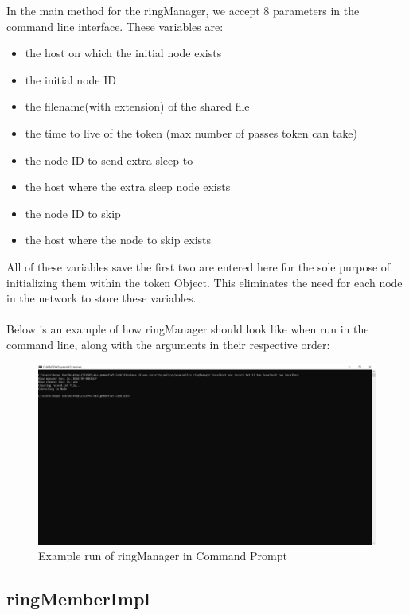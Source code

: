 \documentclass[11pt, a4paper]{article}
\begin{document}
In the main method for the ringManager, we accept 8 parameters in the command line interface. These variables are:
\begin{itemize}
\item the host on which the initial node exists
\item the initial node ID
\item the filename(with extension) of the shared file
\item the time to live of the token (max number of passes token can take)
\item the node ID to send extra sleep to
\item the host where the extra sleep node exists
\item the node ID to skip
\item the host where the node to skip exists
\end{itemize} 
All of these variables save the first two are entered here for the sole purpose of initializing them within the token Object. This eliminates the need for each node in the network to store these variables.\\\\
Below is an example of how ringManager should look like when run in the command line, along with the arguments in their respective order:
\begin{figure}[!h]
\centering
\includegraphics[scale=0.35]{ring_manager}
\caption{Example run of ringManager in Command Prompt}
\end{figure}

\subsection{ringMemberImpl}
\end{document}
